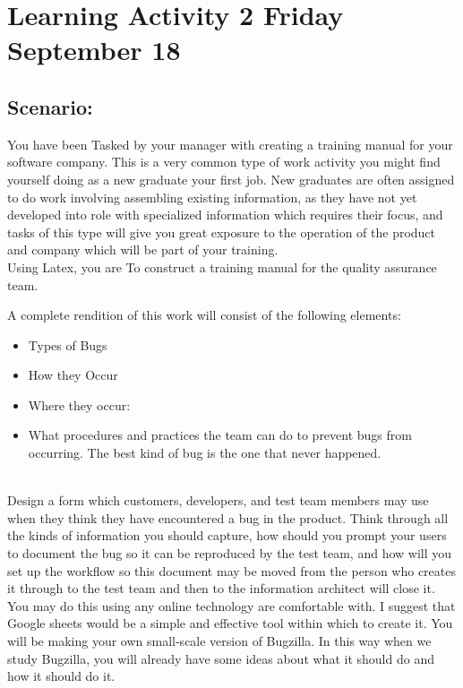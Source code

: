 \section{Learning Activity 2  Friday September 18}

\subsection{Scenario:}

You have been Tasked by your manager with creating a training manual for your software company. This is a very common type of work activity you might find yourself doing as a new graduate your first job. New graduates are often assigned to do work involving assembling existing information, as they have not yet developed into role with specialized information which requires their focus, and tasks of this type will give you great exposure to the operation of the product and company which will be part of your training.
\\
Using Latex, you are To construct a training manual for the quality assurance team.

A complete rendition of this work will consist of the following elements:
\begin{itemize}
    \item Types of Bugs
    \item How they Occur   
    \item Where they occur: 
    \item What procedures and practices the team can do to prevent bugs from occurring. The best kind of bug is the one that never happened.
\end{itemize}
\\
Design a form which customers, developers, and test team members may use when they think they have encountered a bug in the product. Think through all the kinds of information you should capture, how should you prompt your users to document the bug so it can be reproduced by the test team, and how will you set up the workflow so this document may be moved from the person who creates it through to the test team and then to the information architect will close it.
\\
You may do this using any online technology are comfortable with. I suggest that Google sheets would be a simple and effective tool within which to create it. You will be making your own small-scale version of Bugzilla. In this way when we study Bugzilla, you will already have some ideas about what it should do and how it should do it.
\newline


